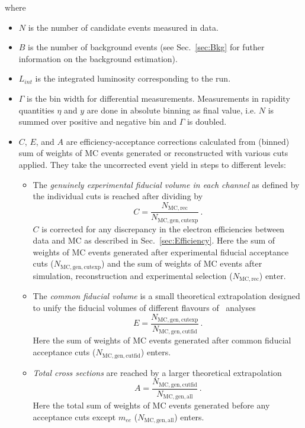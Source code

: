where
\begin{itemize}
\item {\bfseries $N$} is the number of candidate events measured in data.
\item {\bfseries $B$} is the number of background events (see Sec.~\ref{sec:Bkg} for futher information on the background estimation).
\item {\bfseries $L_{int}$} is the integrated luminosity corresponding to the run.
\item {\bfseries $\Gamma$} is the bin width for differential measurements. Measurements in rapidity quantities $\eta$ and $y$ are done in absolute binning as final value, i.e. $N$ is summed over positive and negative bin and $\Gamma$ is doubled.
\item $C$, $E$, and $A$ are efficiency-acceptance corrections calculated from (binned) sum of weights of MC events generated or reconstructed with various cuts applied. They take the uncorrected event yield in steps to different levels:
  \begin{itemize}
  \item The \textit{genuinely experimental fiducial volume in each channel} as defined by the individual cuts is reached after dividing by
    \begin{equation}
      C = \frac{N_\mathrm{MC, rec}}{N_\mathrm{MC, gen, cutexp}}\,.
    \end{equation}
    $C$ is corrected for any discrepancy in the electron efficiencies between data and MC as described in Sec.~\ref{sec:Efficiency}. Here the sum of weights of MC events generated after experimental fiducial acceptance cuts ($N_\mathrm{MC, gen, cutexp}$) and the sum of weights of MC events after simulation, reconstruction and experimental selection ($N_\mathrm{MC, rec}$) enter.
  \item The \textit{common fiducial volume} is a small theoretical extrapolation designed to unify the fiducial volumes of different flavours of \Zll\ analyses
    \begin{equation}
      E = \frac{N_\mathrm{MC, gen, cutexp}}{N_\mathrm{MC, gen, cutfid}}\,.
    \end{equation}
    Here the sum of weights of MC events generated after common fiducial acceptance cuts ($N_\mathrm{MC, gen, cutfid}$) enters.
  \item \textit{Total cross sections} are reached by a larger theoretical extrapolation
    \begin{equation}
      A = \frac{N_\mathrm{MC, gen, cutfid}}{N_\mathrm{MC, gen, all}}\,.
    \end{equation}
    Here the total sum of weights of MC events generated before any acceptance cuts except $m_{ee}$ ($N_\mathrm{MC, gen, all}$) enters.
  \end{itemize}
\end{itemize}

